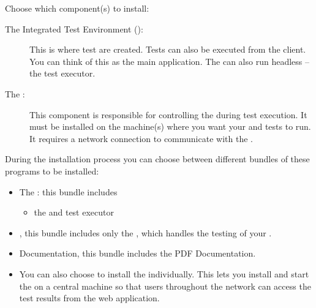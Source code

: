 Choose which component(s) to install: 

\begin{description}
\item [The Integrated Test Environment (\ite{}): ]{This is where test are created. Tests can also be executed from the client. You can think of this as the main application. The \ite{} can also run headless -- the test executor.}
\item [The \gdagent{}:]{ This component is responsible for controlling the \gdaut{} during test execution. It must be installed on the machine(s) where you want your \gdaut{} and tests to run. It requires a network connection to communicate with the \ite{}. }
\end{description}

During the installation process you can choose between different bundles of these programs to be installed:

\begin{itemize}
\item The \ite{}: this bundle includes
	\begin{itemize}
	\item the \ite{} and test executor
	\end{itemize}
\item \gdagent{}, this bundle includes only the \gdagent{}, which handles the testing of your \gdaut{}.
\item  Documentation, this bundle includes the PDF Documentation.
\item You can also choose to install the \dash{} individually. This lets you install and start the \dash{} on a central machine so that users throughout the network can access the test results from the web application. 
\end{itemize}
